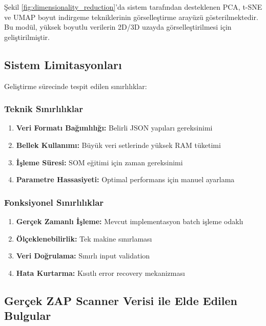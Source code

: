 Şekil \ref{fig:dimensionality_reduction}'da sistem tarafından desteklenen PCA, t-SNE ve UMAP boyut indirgeme tekniklerinin görselleştirme arayüzü gösterilmektedir. Bu modül, yüksek boyutlu verilerin 2D/3D uzayda görselleştirilmesi için geliştirilmiştir.

\newpage

\subsection{Sistem Limitasyonları}

Geliştirme sürecinde tespit edilen sınırlılıklar:



\subsubsection{Teknik Sınırlılıklar}

\begin{enumerate}
    \item \textbf{Veri Formatı Bağımlılığı:} Belirli JSON yapıları gereksinimi
    \item \textbf{Bellek Kullanımı:} Büyük veri setlerinde yüksek RAM tüketimi
    \item \textbf{İşleme Süresi:} SOM eğitimi için zaman gereksinimi
    \item \textbf{Parametre Hassasiyeti:} Optimal performans için manuel ayarlama
\end{enumerate}

\hspace{-1cm}

\subsubsection{Fonksiyonel Sınırlılıklar}

\begin{enumerate}
    \item \textbf{Gerçek Zamanlı İşleme:} Mevcut implementasyon batch işleme odaklı
    \item \textbf{Ölçeklenebilirlik:} Tek makine sınırlaması
    \item \textbf{Veri Doğrulama:} Sınırlı input validation
    \item \textbf{Hata Kurtarma:} Kısıtlı error recovery mekanizması
\end{enumerate}

\newpage

\subsection{Gerçek ZAP Scanner Verisi ile Elde Edilen Bulgular}

